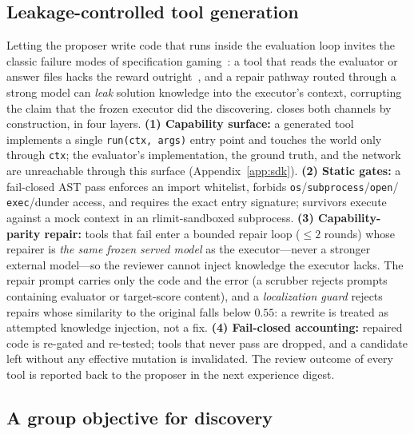\subsection{Leakage-controlled tool generation}
\label{sec:method-safety}

Letting the proposer write code that runs inside the evaluation loop
invites the classic failure modes of specification
gaming~\citep{skalse2022,specgaming}: a tool that reads the evaluator or
answer files hacks the reward outright~\citep{denison2024,baker2025,
impossiblebench}, and a repair pathway routed through a strong model can
\emph{leak} solution knowledge into the executor's context, corrupting the
claim that the frozen executor did the discovering.  \method{} closes both
channels by construction, in four layers.
\textbf{(1) Capability surface:} a generated tool implements a single
\texttt{run(ctx, args)} entry point and touches the world only through
\texttt{ctx}; the evaluator's implementation, the ground truth, and the
network are unreachable through this surface
(Appendix~\ref{app:sdk}).
\textbf{(2) Static gates:} a fail-closed AST pass enforces an import
whitelist, forbids \texttt{os}/\texttt{subprocess}/\texttt{open}/%
\texttt{exec}/dunder access, and requires the exact entry signature;
survivors execute against a mock context in an rlimit-sandboxed subprocess.
\textbf{(3) Capability-parity repair:} tools that fail enter a bounded
repair loop ($\le 2$ rounds) whose repairer is \emph{the same frozen served
model} as the executor---never a stronger external model---so the reviewer
cannot inject knowledge the executor lacks.  The repair prompt carries only
the code and the error (a scrubber rejects prompts containing evaluator or
target-score content), and a \emph{localization guard} rejects repairs whose
similarity to the original falls below $0.55$: a rewrite is treated as
attempted knowledge injection, not a fix.
\textbf{(4) Fail-closed accounting:} repaired code is re-gated and
re-tested; tools that never pass are dropped, and a candidate left without
any effective mutation is invalidated.  The review outcome of every tool is
reported back to the proposer in the next experience digest.

\subsection{A group objective for discovery}
\label{sec:method-rl}

